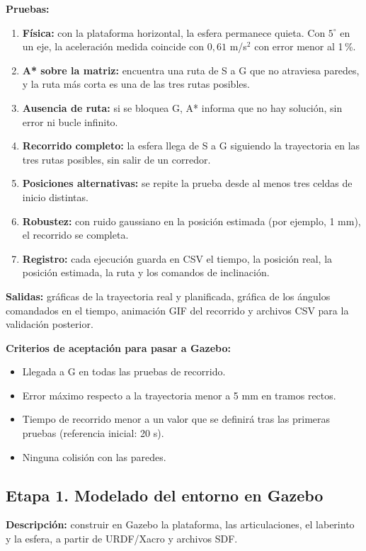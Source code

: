 \documentclass[11pt,a4paper]{article}
\begin{document}
\textbf{Pruebas:}
\begin{enumerate}
    \item \textbf{Física:} con la plataforma horizontal, la esfera permanece quieta. Con $5^\circ$ en un eje, la aceleración medida coincide con $0{,}61$ m/s$^2$ con error menor al 1\,\%.
    \item \textbf{A* sobre la matriz:} encuentra una ruta de S a G que no atraviesa paredes, y la ruta más corta es una de las tres rutas posibles.
    \item \textbf{Ausencia de ruta:} si se bloquea G, A* informa que no hay solución, sin error ni bucle infinito.
    \item \textbf{Recorrido completo:} la esfera llega de S a G siguiendo la trayectoria en las tres rutas posibles, sin salir de un corredor.
    \item \textbf{Posiciones alternativas:} se repite la prueba desde al menos tres celdas de inicio distintas.
    \item \textbf{Robustez:} con ruido gaussiano en la posición estimada (por ejemplo, 1 mm), el recorrido se completa.
    \item \textbf{Registro:} cada ejecución guarda en CSV el tiempo, la posición real, la posición estimada, la ruta y los comandos de inclinación.
\end{enumerate}

\textbf{Salidas:} gráficas de la trayectoria real y planificada, gráfica de los ángulos comandados en el tiempo, animación GIF del recorrido y archivos CSV para la validación posterior.

\textbf{Criterios de aceptación para pasar a Gazebo:}
\begin{itemize}
    \item Llegada a G en todas las pruebas de recorrido.
    \item Error máximo respecto a la trayectoria menor a 5 mm en tramos rectos.
    \item Tiempo de recorrido menor a un valor que se definirá tras las primeras pruebas (referencia inicial: 20 s).
    \item Ninguna colisión con las paredes.
\end{itemize}

\subsection{Etapa 1. Modelado del entorno en Gazebo}
\textbf{Descripción:} construir en Gazebo la plataforma, las articulaciones, el laberinto y la esfera, a partir de URDF/Xacro y archivos SDF.
\end{document}
